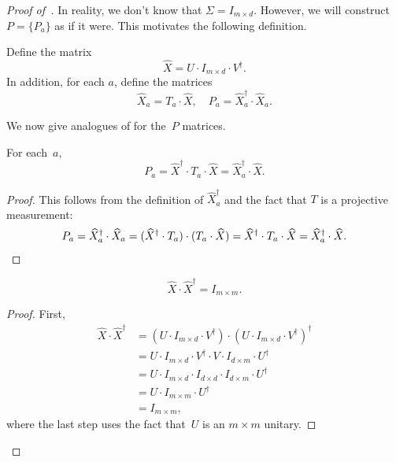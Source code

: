 \begin{proof}[Proof of~]
In reality, we don't know that $\Sigma = I_{m \times d}$.
However, we will construct~$P = \{P_a\}$ as if it were.
This motivates the following definition.

\begin{definition}[Definition of~$P$]
Define the matrix 
\begin{equation*}
\widehat{X} = U  \cdot I_{m \times d} \cdot V^\dagger.
\end{equation*}
In addition, for each $a$, define the matrices
\begin{equation*}
\widehat{X}_a  = T_a \cdot \widehat{X},
\quad P_a  = \widehat{X}_a^\dagger \cdot \widehat{X}_a.
\end{equation*}
\end{definition}

We now give analogues of  for the~$P$ matrices.

\begin{lemma}[$P_a$ restated]\label{lem:pa-restated}
For each~$a$,
\begin{equation*}
P_a = \widehat{X}^\dagger \cdot T_a \cdot \widehat{X} = \widehat{X}_a^\dagger \cdot \widehat{X}.
\end{equation*}
\end{lemma}
\begin{proof}
This follows from the definition of $\widehat{X}^\dagger_a$ and the fact that $T$ is a projective measurement:
\begin{equation*}
P_a
= \widehat{X}_a^\dagger \cdot \widehat{X}_a
= (\widehat{X}^\dagger \cdot T_a) \cdot (T_a  \cdot \widehat{X})
= \widehat{X}^\dagger \cdot T_a \cdot \widehat{X} = \widehat{X}_a^\dagger \cdot \widehat{X}.\qedhere
\end{equation*}
\end{proof}

\begin{lemma}\label{lem:X-hat-squared}
\begin{equation*}
\widehat{X} \cdot \widehat{X}^\dagger = I_{m \times m}.
\end{equation*}
\end{lemma}
\begin{proof}
First,
\begin{align*}
\widehat{X} \cdot \widehat{X}^\dagger
&= (U  \cdot I_{m \times d} \cdot V^\dagger) \cdot (U  \cdot I_{m \times d} \cdot V^\dagger)^\dagger\\
&= U  \cdot I_{m \times d} \cdot V^\dagger \cdot V \cdot I_{d \times m} \cdot U^\dagger\\
&= U  \cdot I_{m \times d} \cdot I_{d \times d} \cdot I_{d \times m} \cdot U^\dagger \tag{because~$V$ is a $d \times d$ unitary}\\
&= U  \cdot I_{m \times m} \cdot U^\dagger \tag{because~$m \leq d$}\\
&= I_{m \times m},
\end{align*}
where the last step uses the fact that~$U$ is an $m \times m$ unitary.


\end{proof}
\end{proof}

